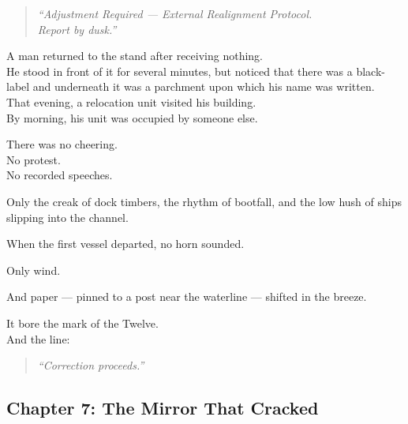 \documentclass[9pt]{article}
\begin{document}
\begin{quote}
\textit{“Adjustment Required — External Realignment Protocol.\\
Report by dusk.”}
\end{quote}

\vspace{1em}

A man returned to the stand after receiving nothing.\\

He stood in front of it for several minutes, but noticed that there was a black-label and underneath it was a parchment upon which his name was written.\\

That evening, a relocation unit visited his building.\\

By morning, his unit was occupied by someone else.

\vspace{1em}

There was no cheering.\\
No protest.\\
No recorded speeches.

Only the creak of dock timbers, the rhythm of bootfall, and the low hush of ships slipping into the channel.

\vspace{1em}

When the first vessel departed, no horn sounded.

Only wind.

And paper — pinned to a post near the waterline — shifted in the breeze.

It bore the mark of the Twelve.\\
And the line:

\begin{quote}
\textit{“Correction proceeds.”}
\end{quote}

\newpage

\subsection*{Chapter 7: The Mirror That Cracked}

\vspace{1in}
\end{document}
